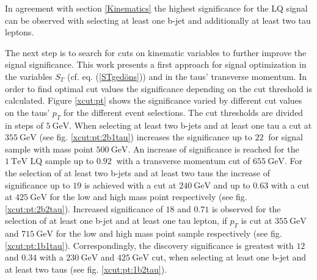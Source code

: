 %
In agreement with section \ref{Kinematics} the highest significance for the LQ signal can be observed with selecting at least one b-jet and additionally at least two tau leptons.\par
The next step is to search for cuts on kinematic variables to further improve the signal significance. This work presents a first approach for signal optimization in the variables $S_T$ (cf. eq. (\ref{STgedöns})) and in the taus' transverse momentum. In order to find optimal cut values the significance depending on the cut threshold is calculated. Figure \ref{xcut:pt} shows the significance varied by different cut values on the taus' $p_T$ for the different event selections. The cut thresholds are divided in steps of $\SI{5}{\giga\electronvolt}$. When selecting at least two b-jets and at least one tau a cut at $\SI{355}{\giga\electronvolt}$ (see fig. \ref{xcut:pt:2b1tau}) increases the significance up to $\SI{22}{}$ for signal sample with mass point $\SI{500}{\giga\electronvolt}$. An increase of significance is reached for the $\SI{1}{\tera\electronvolt}$ LQ sample up to $\SI{0.92}{}$ with a transverse momentum cut of $\SI{655}{\giga\electronvolt}$. For the selection of at least two b-jets and at least two taus the increase of significance up to $19$ is achieved with a cut at $\SI{240}{\giga\electronvolt}$ and up to $0.63$ with a cut at $\SI{425}{\giga\electronvolt}$ for the low and high mass point respectively (see fig. \ref{xcut:pt:2b2tau}). Increased significance of $18$ and $0.71$ is observed for the selection of at least one b-jet and at least one tau lepton, if $p_T$ is cut at $\SI{355}{\giga\electronvolt}$ and $\SI{715}{\giga\electronvolt}$ for the low and high mass point sample respectively (see fig. \ref{xcut:pt:1b1tau}). Correspondingly, the discovery significance is greatest with $12$ and $0.34$ with a $\SI{230}{\giga\electronvolt}$ and $\SI{425}{\giga\electronvolt}$ cut, when selecting at least one b-jet and at least two taus (see fig. \ref{xcut:pt:1b2tau}). \newline
%
